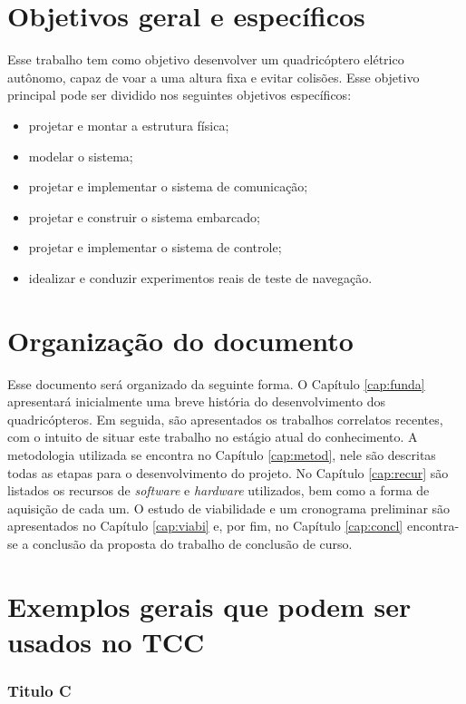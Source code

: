 \section{Objetivos geral e específicos}

Esse trabalho tem como objetivo desenvolver um quadricóptero elétrico autônomo, capaz de voar a uma altura fixa e evitar colisões. Esse objetivo principal pode ser dividido nos seguintes objetivos específicos:

\begin{itemize}
\item projetar e montar a estrutura física;
\item modelar o sistema;
\item projetar e implementar o sistema de comunicação;
\item projetar e construir o sistema embarcado;
\item projetar e implementar o sistema de controle;
\item idealizar e conduzir experimentos reais de teste de navegação.
\end{itemize}


\section{Organização do documento}

Esse documento será organizado da seguinte forma. O Capítulo \ref{cap:funda} apresentará inicialmente uma breve história do desenvolvimento dos quadricópteros. Em seguida, são apresentados os trabalhos correlatos recentes, com o intuito de situar este trabalho no estágio atual do conhecimento. A metodologia utilizada se encontra no Capítulo \ref{cap:metod}, nele são descritas todas as etapas para o desenvolvimento do projeto. No Capítulo \ref{cap:recur} são listados os recursos de \textit{software} e \textit{hardware} utilizados, bem como a forma de aquisição de cada um. O estudo de viabilidade e um cronograma preliminar são apresentados no Capítulo \ref{cap:viabi} e, por fim, no Capítulo \ref{cap:concl} encontra-se a conclusão da proposta do trabalho de conclusão de curso.

\section{Exemplos gerais que podem ser usados no TCC}\label{subsec:ExemplosLatex}



\subsubsection{Titulo C}\label{ssubsec:tituloc}

